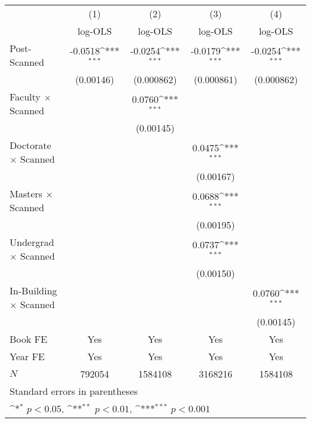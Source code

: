 {
\def\sym#1{\ifmmode^{#1}\else\(^{#1}\)\fi}
\begin{tabular}{l*{4}{c}}
\hline\hline
            &\multicolumn{1}{c}{(1)}&\multicolumn{1}{c}{(2)}&\multicolumn{1}{c}{(3)}&\multicolumn{1}{c}{(4)}\\
            &\multicolumn{1}{c}{log-OLS}&\multicolumn{1}{c}{log-OLS}&\multicolumn{1}{c}{log-OLS}&\multicolumn{1}{c}{log-OLS}\\
\hline
Post-Scanned&     -0.0518\sym{***}&     -0.0254\sym{***}&     -0.0179\sym{***}&     -0.0254\sym{***}\\
            &   (0.00146)         &  (0.000862)         &  (0.000861)         &  (0.000862)         \\
[1em]
Faculty $\times$ Scanned&                     &      0.0760\sym{***}&                     &                     \\
            &                     &   (0.00145)         &                     &                     \\
[1em]
Doctorate $\times$ Scanned&                     &                     &      0.0475\sym{***}&                     \\
            &                     &                     &   (0.00167)         &                     \\
[1em]
Masters $\times$  Scanned&                     &                     &      0.0688\sym{***}&                     \\
            &                     &                     &   (0.00195)         &                     \\
[1em]
Undergrad $\times$ Scanned&                     &                     &      0.0737\sym{***}&                     \\
            &                     &                     &   (0.00150)         &                     \\
[1em]
In-Building $\times$ Scanned&                     &                     &                     &      0.0760\sym{***}\\
            &                     &                     &                     &   (0.00145)         \\
\hline
Book FE     &         Yes         &         Yes         &         Yes         &         Yes         \\
Year FE     &         Yes         &         Yes         &         Yes         &         Yes         \\
\(N\)       &      792054         &     1584108         &     3168216         &     1584108         \\
\hline\hline
\multicolumn{5}{l}{\footnotesize Standard errors in parentheses}\\
\multicolumn{5}{l}{\footnotesize \sym{*} \(p<0.05\), \sym{**} \(p<0.01\), \sym{***} \(p<0.001\)}\\
\end{tabular}
}
